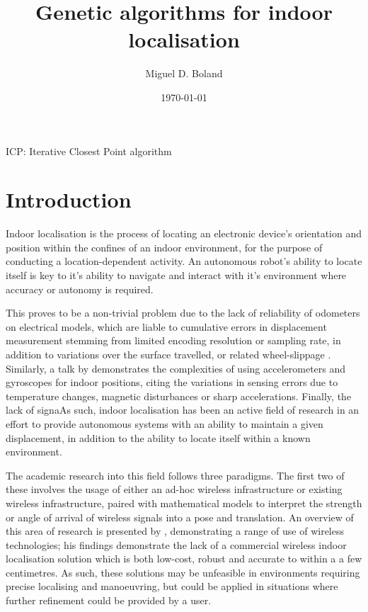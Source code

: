 \documentclass[authoryearcitations]{UoYCSproject}
\author{Miguel D. Boland}
\title{Genetic algorithms for indoor localisation}
\date{\today}
\begin{document}
\maketitle
\listoffigures
\listoftables
ICP: Iterative Closest Point algorithm


\chapter{Introduction}
\label{cha:Introduction}
Indoor localisation is the process of locating an electronic device's orientation and position within the confines of an indoor environment, for the purpose of conducting a location-dependent activity. An autonomous robot's ability to locate itself is key to it's ability to navigate and interact with it's environment where accuracy or autonomy is required. 

This proves to be a non-trivial problem due to the lack of reliability of odometers on electrical models, which are liable to cumulative errors in displacement measurement stemming from limited encoding resolution or sampling rate, in addition to variations over the surface travelled, or related wheel-slippage \cite{Borenstein1996-al}. Similarly, a talk by \citet{Sachs2010-pw} demonstrates the complexities of using accelerometers and gyroscopes for indoor positions, citing the variations in sensing errors due to temperature changes, magnetic disturbances or sharp accelerations. Finally, the lack of signaAs such, indoor localisation has been an active field of research in an effort to provide autonomous systems with an ability to maintain a given displacement, in addition to the ability to locate itself within a known environment. 

The academic research into this field follows three paradigms. The first two of these involves the usage of either an ad-hoc wireless infrastructure or existing wireless infrastructure, paired with mathematical models to interpret the strength or angle of arrival of wireless signals into a pose and translation. An overview of this area of research is presented by \citet{Liu2007-in}, demonstrating a range of use of wireless technologies; his findings demonstrate the lack of a commercial wireless indoor localisation solution which is both low-cost, robust and accurate to within a a few centimetres. As such, these solutions may be unfeasible in environments requiring precise localising and manoeuvring, but could be applied in situations where further refinement could be provided by a user.
\end{document}
